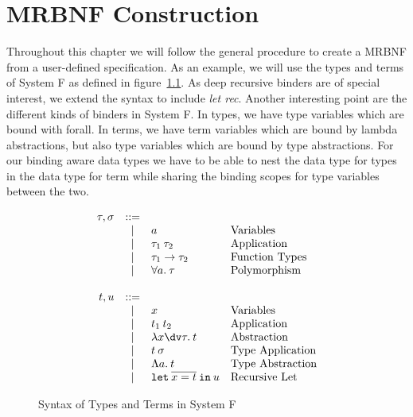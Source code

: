 \chapter{MRBNF Construction}

Throughout this chapter we will follow the general procedure to create a \ac{MRBNF} from a user-defined specification. As an example, we will use the types and terms of System F as defined in figure~\ref{fig:systemf_syntax}. As deep recursive binders are of special interest, we extend the syntax to include \textit{let rec}. Another interesting point are the different kinds of binders in System F. In types, we have type variables which are bound with forall. In terms, we have term variables which are bound by lambda abstractions, but also type variables which are bound by type abstractions. For our binding aware data types we have to be able to nest the data type for types in the data type for term while sharing the binding scopes for type variables between the two.

\begin{figure}[H]
\[
\begin{array}{rcll}
\tau, \sigma & \bnfeq &  & \\ %
& \bnfor & a & \text{Variables} \\
& \bnfor & \tau_1 \: \tau_2 & \text{Application} \\
& \bnfor & \tau_1 \to \tau_2 & \text{Function Types} \\
& \bnfor & \forall a. \: \tau & \text{Polymorphism} \\
& & & \\
t, u & \bnfeq & & \\
& \bnfor & x & \text{Variables} \\
& \bnfor & t_1 \: t_2 & \text{Application} \\
& \bnfor & \lambda x\dv\tau. \: t & \text{Abstraction} \\
& \bnfor & t \: \sigma & \text{Type Application} \\
& \bnfor & \Lambda a . \: t & \text{Type Abstraction} \\
& \bnfor & \texttt{let} \: \overline{x = t} \: \texttt{in} \: u & \text{Recursive Let} \\
\end{array}
\]
\caption{Syntax of Types and Terms in System F}
\label{fig:systemf_syntax}
\end{figure}

